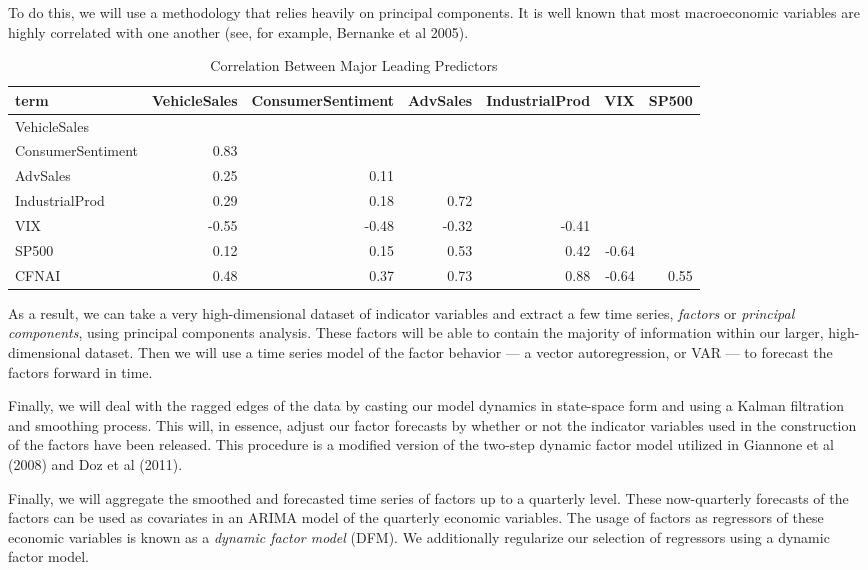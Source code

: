 \documentclass[11pt, letterpaper]{article}\usepackage[]{graphicx}\usepackage[]{color}
\begin{document}
To do this, we will use a methodology that relies heavily on principal components. It is well known that most macroeconomic variables are highly correlated with one another (see, for example, Bernanke et al 2005).
\begin{table}[H]
\centering
\begingroup\scriptsize
\begin{tabular}{lrrrrrr}
  \hline
term & VehicleSales & ConsumerSentiment & AdvSales & IndustrialProd & VIX & SP500 \\ 
  \hline
VehicleSales &  &  &  &  &  &  \\ 
  ConsumerSentiment & 0.83 &  &  &  &  &  \\ 
  AdvSales & 0.25 & 0.11 &  &  &  &  \\ 
  IndustrialProd & 0.29 & 0.18 & 0.72 &  &  &  \\ 
  VIX & -0.55 & -0.48 & -0.32 & -0.41 &  &  \\ 
  SP500 & 0.12 & 0.15 & 0.53 & 0.42 & -0.64 &  \\ 
  CFNAI & 0.48 & 0.37 & 0.73 & 0.88 & -0.64 & 0.55 \\ 
   \hline
\end{tabular}
\endgroup
\caption{Correlation Between Major Leading Predictors} 
\end{table}

As a result, we can take a very high-dimensional dataset of indicator variables and extract a few time series, \textit{factors} or \textit{principal components}, using principal components analysis. These factors will be able to contain the majority of information within our larger, high-dimensional dataset. Then we will use a time series model of the factor behavior --- a vector autoregression, or VAR --- to forecast the factors forward in time. 

Finally, we will deal with the ragged edges of the data by casting our model dynamics in state-space form and using a Kalman filtration and smoothing process. This will, in essence, adjust our factor forecasts by whether or not the indicator variables used in the construction of the factors have been released. This procedure is a modified version of the two-step dynamic factor model utilized in Giannone et al (2008) and Doz et al (2011).

Finally, we will aggregate the smoothed and forecasted time series of factors up to a quarterly level. These now-quarterly forecasts of the factors can be used as covariates in an ARIMA model of the quarterly economic variables. The usage of factors as regressors of these economic variables is known as a \textit{dynamic factor model} (DFM). We additionally regularize our selection of regressors using a dynamic factor model.
\end{document}
